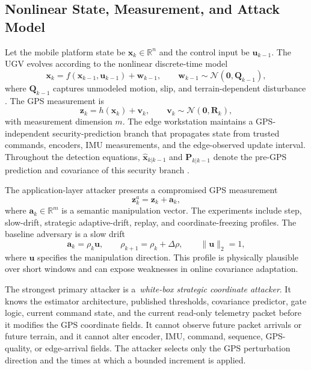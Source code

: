 \documentclass[11pt,a4paper]{article}
\begin{document}
\subsection{Nonlinear State, Measurement, and Attack Model}
Let the mobile platform state be $\mathbf{x}_k \in \mathbb{R}^n$ and the control input be $\mathbf{u}_{k-1}$. The UGV evolves according to the nonlinear discrete-time model
\begin{equation}
\mathbf{x}_k = f(\mathbf{x}_{k-1},\mathbf{u}_{k-1}) + \mathbf{w}_{k-1},
\qquad
\mathbf{w}_{k-1} \sim \mathcal{N}(\mathbf{0},\mathbf{Q}_{k-1}),
\end{equation}
where $\mathbf{Q}_{k-1}$ captures unmodeled motion, slip, and terrain-dependent disturbance \cite{ref11,ref12,ref14}. The GPS measurement is
\begin{equation}
\mathbf{z}_k = h(\mathbf{x}_k) + \mathbf{v}_k,
\qquad
\mathbf{v}_k \sim \mathcal{N}(\mathbf{0},\mathbf{R}_k),
\end{equation}
with measurement dimension $m$. The edge workstation maintains a GPS-independent security-prediction branch that propagates state from trusted commands, encoders, IMU measurements, and the edge-observed update interval. Throughout the detection equations, $\hat{\mathbf{x}}_{k|k-1}$ and $\mathbf{P}_{k|k-1}$ denote the pre-GPS prediction and covariance of this security branch \cite{ref63}.

The application-layer attacker presents a compromised GPS measurement
\begin{equation}
\mathbf{z}^{a}_k = \mathbf{z}_k + \mathbf{a}_k,
\end{equation}
where $\mathbf{a}_k \in \mathbb{R}^{m}$ is a semantic manipulation vector. The experiments include step, slow-drift, strategic adaptive-drift, replay, and coordinate-freezing profiles. The baseline adversary is a slow drift
\begin{equation}
\mathbf{a}_k = \rho_k \mathbf{u}, \qquad \rho_{k+1}=\rho_k+\Delta\rho, \qquad \|\mathbf{u}\|_2=1,
\end{equation}
where $\mathbf{u}$ specifies the manipulation direction. This profile is physically plausible over short windows and can expose weaknesses in online covariance adaptation.

The strongest primary attacker is a \,\emph{white-box strategic coordinate attacker}. It knows the estimator architecture, published thresholds, covariance predictor, gate logic, current command state, and the current read-only telemetry packet before it modifies the GPS coordinate fields. It cannot observe future packet arrivals or future terrain, and it cannot alter encoder, IMU, command, sequence, GPS-quality, or edge-arrival fields. The attacker selects only the GPS perturbation direction and the times at which a bounded increment is applied.
\end{document}
